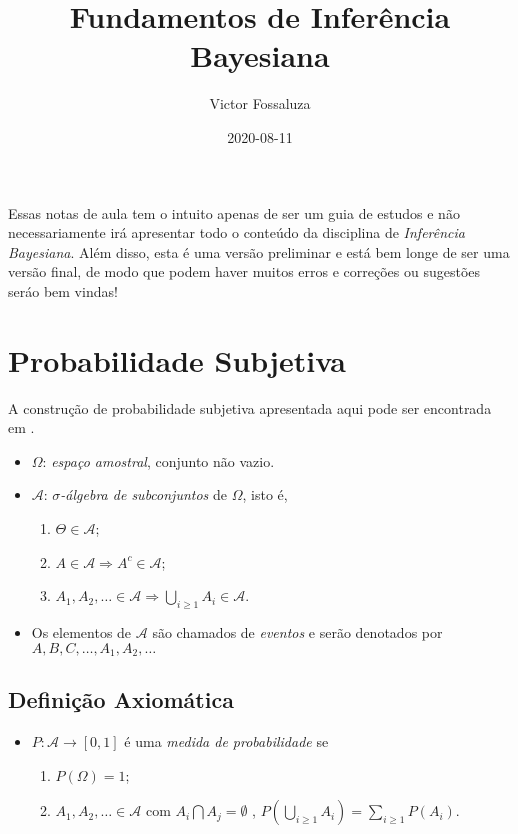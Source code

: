 \documentclass[
]{book}
\title{Fundamentos de Inferência Bayesiana}
\author{Victor Fossaluza}
\date{2020-08-11}
\providecommand{\tightlist}{%
  \setlength{\itemsep}{0pt}\setlength{\parskip}{0pt}}
\begin{document}
\maketitle

{
\setcounter{tocdepth}{1}
\tableofcontents
}
Essas notas de aula tem o intuito apenas de ser um guia de estudos e não necessariamente irá apresentar todo o conteúdo da disciplina de \emph{Inferência Bayesiana}. Além disso, esta é uma versão preliminar e está bem longe de ser uma versão final, de modo que podem haver muitos erros e correções ou sugestões seráo bem vindas!

\hypertarget{ProbSubj}{%
\chapter{Probabilidade Subjetiva}\label{ProbSubj}}

A construção de probabilidade subjetiva apresentada aqui pode ser encontrada em \citet{DeGroot70}.

\begin{itemize}
\item
  \(\Omega\): \emph{espaço amostral}, conjunto não vazio.
\item
  \(\mathcal{A}\): \emph{\(\sigma\)-álgebra de subconjuntos} de \(\Omega\), isto é,

  \begin{enumerate}
  \def\labelenumi{\arabic{enumi}.}
  \tightlist
  \item
    \(\Theta \in \mathcal{A}\);
  \item
    \(A \in \mathcal{A} \Longrightarrow A^{c} \in \mathcal{A}\);
  \item
    \(\displaystyle A_1, A_2, \ldots \in \mathcal{A} \Longrightarrow \bigcup_{i\geq1} A_i \in \mathcal{A}\).
  \end{enumerate}
\item
  Os elementos de \(\mathcal{A}\) são chamados de \emph{eventos} e serão denotados por \(A, B, C, \ldots, A_1, A_2, \ldots\)
\end{itemize}

\hypertarget{definiuxe7uxe3o-axiomuxe1tica}{%
\section{Definição Axiomática}\label{definiuxe7uxe3o-axiomuxe1tica}}

\begin{itemize}
\tightlist
\item
  \(P: \mathcal{A} \longrightarrow [0,1]\) é uma \emph{medida de probabilidade} se

  \begin{enumerate}
  \def\labelenumi{\arabic{enumi}.}
  \tightlist
  \item
    \(P(\Omega) = 1\);
  \item
    \(\displaystyle A_1, A_2, \ldots \in \mathcal{A}\) com \(A_i \bigcap A_j = \emptyset\) , \(\displaystyle P\left(\bigcup_{i \geq 1} A_i\right) = \sum_{i \geq 1} P\left(A_i\right)\).
  \end{enumerate}
\end{itemize}
\end{document}
